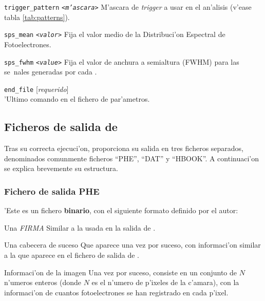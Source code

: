 \begin{Uentry}
\item[\texttt{trigger\_pattern} \quad
  \texttt{<\emph{m'ascara}>}] 
%
  M'ascara de \emph{trigger} a usar en el an'alisis (v'ease tabla
  \ref{tab:patterns}).

\item[\texttt{sps\_mean} \quad
  \texttt{<\emph{valor}>}]
%
  Fija el valor medio de la Distribuci'on Espectral de Fotoelectrones.

\item[\texttt{sps\_fwhm} \quad
  \texttt{<\emph{value}>}]
%
  Fija el valor de anchura a semialtura (FWHM) para las se~nales
  generadas por cada \phe.

\item[\texttt{end\_file}]
%
  [\emph{requerido}] \\
  'Ultimo comando en el fichero de par'ametros.

\end{Uentry}


\subsection{Ficheros de salida de \camera}

Tras su correcta ejecuci'on, \camera proporciona su salida en tres
ficheros separados, denominados comunmente ficheros ``PHE'', ``DAT'' y
``HBOOK''. A continuaci'on se explica brevemente su estructura.

\subsubsection*{Fichero de salida PHE}

'Este es un fichero \textbf{binario}, con el siguiente formato
definido por el autor:

\begin{Uentry}
  
\item[Una \emph{FIRMA}] Similar a la usada en la salida de .
  
\item[Una cabecera de suceso] Que aparece una vez por suceso, con
  informaci'on similar a la que aparece en el fichero de salida de
  .
  
\item[Informaci'on de la imagen] Una vez por suceso, consiste en un
  conjunto de $N$ n'umeros enteros (donde $N$ es el n'umero de
  p'ixeles de la c'amara), con la informaci'on de cuantos
  fotoelectrones se han registrado en cada p'ixel.
  
\end{Uentry}

